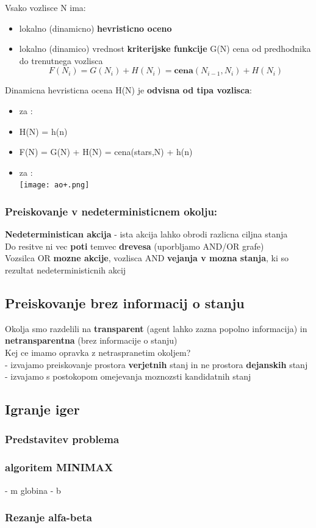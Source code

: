Vsako vozlisce N ima:
\begin{itemize}[noitemsep,topsep=0pt,leftmargin=*]
    \item lokalno (dinamicno) \textbf{hevristicno oceno} 
    \item lokalno (dinamico) vrednost \textbf{kriterijske funkcije} 
    G(N) cena od predhodnika do trenutnega vozlisca
    $$F(N_i)=G(N_i)+H(N_i)=\textbf{cena}(N_{i-1},N_i)+H(N_i)$$
\end{itemize}
Dinamicna hevristicna ocena H(N) je \textbf{odvisna od tipa vozlisca}:
\begin{itemize}[noitemsep,topsep=0pt,leftmargin=*]
    \item za :
        \item H(N) = h(n)
        \item F(N) = G(N) + H(N) = cena(stars,N) + h(n)
    \item za :\\
    \texttt{[image: ao+.png]}
\end{itemize}
\subsubsection{Preiskovanje v nedeterministicnem okolju:}
\textbf{Nedeterministican akcija} - ista akcija lahko obrodi razlicna ciljna stanja\\
Do resitve ni vec \textbf{poti} temvec \textbf{drevesa} (uporbljamo AND/OR grafe)\\
Vozsilca OR \textbf{mozne akcije}, vozlisca AND \textbf{vejanja v mozna stanja}, ki so rezultat nedeterministicnih akcij

\subsection{Preiskovanje brez informacij o stanju}
Okolja smo razdelili na \textbf{transparent} (agent lahko zazna popolno informacija) in \textbf{netransparentna} (brez informacije o stanju)\\
Kej ce imamo opravka z netraspranetim okoljem?\\
- izvajamo preiskovanje prostora \textbf{verjetnih} stanj in ne prostora \textbf{dejanskih} stanj\\
- izvajamo s postokopom omejevanja moznozsti kandidatnih stanj\

\subsection{Igranje iger}

\subsubsection{Predstavitev problema}

\subsubsection{algoritem MINIMAX}
- m globina
- b 

\subsubsection{Rezanje alfa-beta}
